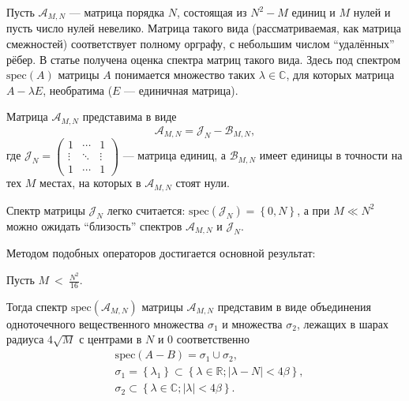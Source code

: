 Пусть \( \mathscr{A}_{M,N} \) --- матрица порядка \( N \),
состоящая из \( N^2 - M \) единиц и \( M \) нулей
и пусть число нулей невелико.
Матрица такого вида (рассматриваемая, как матрица смежностей) соответствует
полному орграфу, с небольшим числом ``удалённых'' рёбер.
В статье получена оценка спектра
матриц такого вида.
Здесь под спектром \( \mathrm{spec}\left({A}\right) \) матрицы \( A \)
понимается множество таких \( \lambda\in\mathbb{C} \), для которых
матрица \( A - \lambda E \), необратима (\( E \) --- единичная матрица).

Матрица \( \mathscr{A}_{M,N} \) представима в виде
\[
    \mathscr{A}_{M,N} = \mathscr{J}_{N} - \mathscr{B}_{M,N},
    \]
где \(
\mathscr{J}_{N} =
\begin{pmatrix}1 & \cdots & 1 \\
\vdots & \ddots & \vdots \\
1 & \cdots & 1
\end{pmatrix} \) --- матрица единиц,
а \( \mathscr{B}_{M,N} \) имеет единицы в точности на тех \( M \)
местах, на которых в \( \mathscr{A}_{M,N} \) стоят нули.

Спектр матрицы \( \mathscr{J}_{N} \) легко считается:
\( \mathrm{spec}\left({\mathscr{J}_{N}}\right) = \left\{0, N \right\} \),
а при \( M \ll N^2 \) можно ожидать ``близость'' спектров
\( \mathscr{A}_{M,N} \) и \( \mathscr{J}_{N} \).

Методом подобных операторов \cite{baskakov-harmonic}
достигается основной результат:
\begin{thm}\label{thm:almostallones-spectra}
    Пусть
    \(M~<~\displaystyle{\frac{N^2}{16}}. \)

    Тогда спектр \( \mathrm{spec}\left({\mathscr{A}_{M,N}}\right) \)
    матрицы \( \mathscr{A}_{M,N} \)
    представим в виде объединения
    одноточечного вещественного множества \( \sigma_1 \)
    и множества \( \sigma_2 \),
    лежащих в шарах радиуса \( 4\sqrt{M} \)
    с центрами в \( N \) и \( 0 \) соответственно
    \begin{equation}\begin{aligned}
        & \mathrm{spec}\left({A-B}\right) = \sigma_1 \cup \sigma_2, \\
        & \sigma_1 = \left\{ \lambda_1 \right\}
          \subset \left\{ \lambda\in\mathbb{R}; \lvert \lambda - N\rvert < 4\beta \right\}, \\
        & \sigma_2 \subset \left\{\lambda\in\mathbb{C}; \lvert\lambda\rvert <4\beta \right\}. \\
    \end{aligned}\end{equation}
\end{thm}

